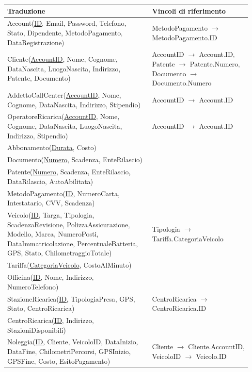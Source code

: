 \documentclass{article}
\begin{document}
\begin{longtable}[H]{|p{7cm}|p{7cm}|}
        \hline
        \textbf{Traduzione} & \textbf{Vincoli di riferimento} \\ \hline
        Account(\underline{ID}, Email, Password, Telefono, Stato, Dipendente, MetodoPagamento, DataRegistrazione) & MetodoPagamento \(\to\) MetodoPagamento.ID \\ \hline
        Cliente(\underline{AccountID}, Nome, Cognome, DataNascita, LuogoNascita, Indirizzo, Patente, Documento) & AccountID \(\to\) Account.ID, Patente \(\to\) Patente.Numero, Documento \(\to\) Documento.Numero \\ \hline
        AddettoCallCenter(\underline{AccountID}, Nome, Cognome, DataNascita, Indirizzo, Stipendio) & AccountID \(\to\) Account.ID \\ \hline
        OperatoreRicarica(\underline{AccountID}, Nome, Cognome, DataNascita, LuogoNascita, Indirizzo, Stipendio) & AccountID \(\to\) Account.ID \\ \hline
        Abbonamento(\underline{Durata}, Costo) & \\ \hline
        Documento(\underline{Numero}, Scadenza, EnteRilascio) & \\ \hline
        Patente(\underline{Numero}, Scadenza, EnteRilascio, DataRilascio, AutoAbilitata) & \\ \hline
        MetodoPagamento(\underline{ID}, NumeroCarta, Intestatario, CVV, Scadenza) & \\ \hline
        Veicolo(\underline{ID}, Targa, Tipologia, ScadenzaRevisione, PolizzaAssicurazione, Modello, Marca, NumeroPosti, DataImmatricolazione, PercentualeBatteria, GPS, Stato, ChilometraggioTotale) & Tipologia \(\to\) Tariffa.CategoriaVeicolo \\ \hline
        Tariffa(\underline{CategoriaVeicolo}, CostoAlMinuto) & \\ \hline
        Officina(\underline{ID}, Nome, Indirizzo, NumeroTelefono) & \\ \hline
        StazioneRicarica(\underline{ID}, TipologiaPresa, GPS, Stato, CentroRicarica) & CentroRicarica \(\to\) CentroRicarica.ID \\ \hline
        CentroRicarica(\underline{ID}, Indirizzo, StazioniDisponibili) & \\ \hline
        Noleggia(\underline{ID}, Cliente, VeicoloID, DataInizio, DataFine, ChilometriPercorsi, GPSInizio, GPSFine, Costo, EsitoPagamento) & Cliente \(\to\) Cliente.AccountID, VeicoloID \(\to\) Veicolo.ID \\ \hline

\end{longtable}
\end{document}
